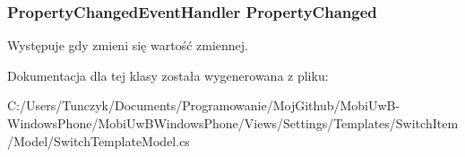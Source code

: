 \subsubsection[{Property\+Changed}]{\setlength{\rightskip}{0pt plus 5cm}Property\+Changed\+Event\+Handler Property\+Changed}\label{a00065_aa421d817626998e9bcafaf0d70106b7f}


Występuje gdy zmieni się wartość zmiennej. 



Dokumentacja dla tej klasy została wygenerowana z pliku\+:\begin{DoxyCompactItemize}
\item 
C\+:/\+Users/\+Tunczyk/\+Documents/\+Programowanie/\+Moj\+Github/\+Mobi\+Uw\+B-\/\+Windows\+Phone/\+Mobi\+Uw\+B\+Windows\+Phone/\+Views/\+Settings/\+Templates/\+Switch\+Item/\+Model/Switch\+Template\+Model.\+cs\end{DoxyCompactItemize}
